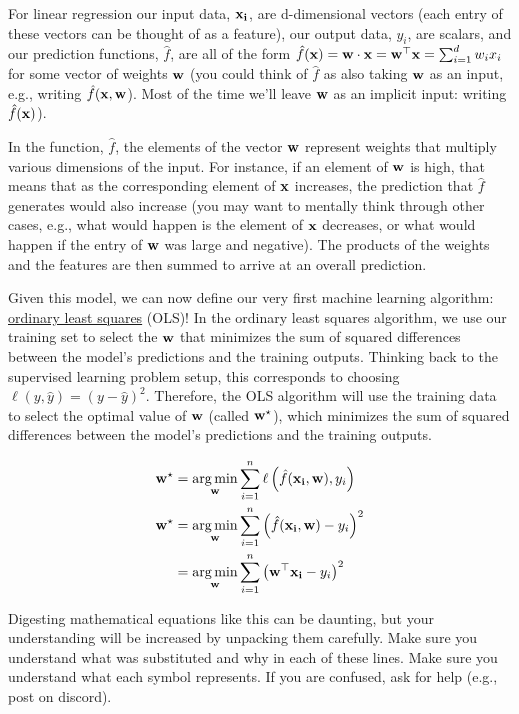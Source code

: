 \documentclass[assignment01_Solutions]{subfiles}
\begin{document}
For linear regression our input data, $\mathbf{x_i}$, are d-dimensional vectors (each entry of these vectors can be thought of as a feature), our output data, $y_i$, are scalars, and our prediction functions, $\hat{f}$, are all of the form $\hat{f}(\mathbf{x}) =\mathbf{w} \cdot \mathbf{x} = \mathbf{w}^\top \mathbf{x} = \sum_{i=1}^d w_i x_i$ for some vector of weights $\mathbf{w}$ (you could think of $\hat{f}$ as also taking $\mathbf{w}$ as an input, e.g., writing $\hat{f}(\mathbf{x}, \mathbf{w}$).  Most of the time we'll leave $\mathbf{w}$ as an implicit input: writing $\hat{f}(\mathbf{x})$).

In the function, $\hat{f}$, the elements of the vector $\mathbf{w}$ represent weights that multiply various dimensions of the input.  For instance, if an element of $\mathbf{w}$ is high, that means that as the corresponding element of $\mathbf{x}$ increases, the prediction that $\hat{f}$ generates would also increase (you may want to mentally think through other cases, e.g., what would happen is the element of $\mathbf{x}$ decreases, or what would happen if the entry of $\mathbf{w}$ was large and negative).  The products of the weights and the features are then summed to arrive at an overall prediction.

Given this model, we can now define our very first machine learning algorithm: \href{https://en.wikipedia.org/wiki/Ordinary_least_squares}{ordinary least squares} (OLS)!  In the ordinary least squares algorithm, we use our training set to select the $\mathbf{w}$ that minimizes the sum of squared differences between the model's predictions and the training outputs.  Thinking back to the supervised learning problem setup, this corresponds to choosing $\ell(y, \hat{y}) = (y - \hat{y})^2$.
Therefore, the OLS algorithm will use the training data to select the optimal value of $\mathbf{w}$ (called $\mathbf{w}^\star$), which minimizes the sum of squared differences between the model's predictions and the training outputs.

\begin{align}
\mathbf{w}^\star &= \operatorname*{arg\,min}_{\mathbf{w}} \sum_{i=1}^n \ell \left ( \hat{f}(\mathbf{x_i}, \mathbf{w}) , y_i \right) \\
\mathbf{w}^\star &= \operatorname*{arg\,min}_{\mathbf{w}} \sum_{i=1}^n \left ( \hat{f}(\mathbf{x_i}, \mathbf{w}) - y_i \right)^2 \\
&= \operatorname*{arg\,min}_{\mathbf{w}} \sum_{i=1}^n \left ( \mathbf{w}^\top \mathbf{x_i} - y_i \right)^2
\end{align}

\begin{notice}
Digesting mathematical equations like this can be daunting, but your understanding will be increased by unpacking them carefully.  Make sure you understand what was substituted and why in each of these lines.  Make sure you understand what each symbol represents.  If you are confused, ask for help (e.g., post on discord).
\end{notice}
\end{document}
